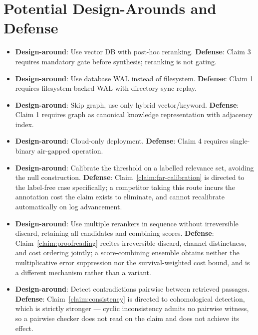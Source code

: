 \section{Potential Design-Arounds and Defense}
\label{sec:patent:defense}

\begin{itemize}
  \item \textbf{Design-around}: Use vector DB with post-hoc reranking. \textbf{Defense}: Claim 3 requires mandatory gate before synthesis; reranking is not gating.
  \item \textbf{Design-around}: Use database WAL instead of filesystem. \textbf{Defense}: Claim 1 requires filesystem-backed WAL with directory-sync replay.
  \item \textbf{Design-around}: Skip graph, use only hybrid vector/keyword. \textbf{Defense}: Claim 1 requires graph as canonical knowledge representation with adjacency index.
  \item \textbf{Design-around}: Cloud-only deployment. \textbf{Defense}: Claim 4 requires single-binary air-gapped operation.
  \item \textbf{Design-around}: Calibrate the threshold on a labelled relevance set, avoiding the null construction. \textbf{Defense}: Claim~\ref{claim:far-calibration} is directed to the label-free case specifically; a competitor taking this route incurs the annotation cost the claim exists to eliminate, and cannot recalibrate automatically on log advancement.
  \item \textbf{Design-around}: Use multiple rerankers in sequence without irreversible discard, retaining all candidates and combining scores. \textbf{Defense}: Claim~\ref{claim:proofreading} recites irreversible discard, channel distinctness, and cost ordering jointly; a score-combining ensemble obtains neither the multiplicative error suppression nor the survival-weighted cost bound, and is a different mechanism rather than a variant.
  \item \textbf{Design-around}: Detect contradictions pairwise between retrieved passages. \textbf{Defense}: Claim~\ref{claim:consistency} is directed to cohomological detection, which is strictly stronger --- cyclic inconsistency admits no pairwise witness, so a pairwise checker does not read on the claim and does not achieve its effect.
\end{itemize}

